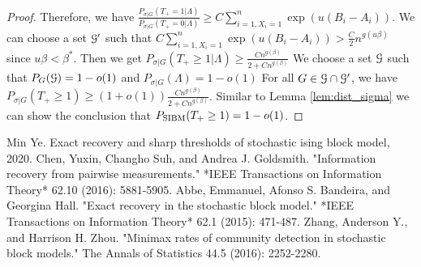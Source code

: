 \documentclass{article}
\begin{document}
\begin{proof}
	Therefore, we have $\frac{P_{\sigma | G}(T_+ = 1 | \Lambda ) }{P_{\sigma | G}(T_+ = 0 | \Lambda )} \geq C\sum_{i=1, X_i=1}^n \exp(u(B_i - A_i))$.
	We can choose a set $\mathcal{G}'$ such that $C\sum_{i=1, X_i=1}^n \exp(u(B_i - A_i)) > \frac{C}{2}n^{g(u\beta)}$ since $u\beta < \beta^*$.
	Then we get $P_{\sigma | G}(T_+\geq 1 | \Lambda) \geq \frac{Cn^{g(\beta)}}{2 + C n^{g(\beta)}} $
	We choose a set $\mathcal{G}$ such that $P_G(\mathcal{G}) = 1-o(1)$ and
	$ P_{\sigma|G} (\Lambda)
	=1- o(1)
	$
	For all $G \in \mathcal{G} \cap \mathcal{G}'$, we have $P_{\sigma | G}(T_+ \geq 1) \geq (1+o(1)) \frac{Cn^{g(\beta)}}{2 + C n^{g(\beta)}}$.
	Similar to Lemma \ref{lem:dist_sigma} we can show the conclusion that $P_{\operatorname{SIBM}}(T_+ \geq 1) = 1-o(1)$.
\end{proof}
\begin{thebibliography}{1}
	

	Min Ye.
	\newblock Exact recovery and sharp thresholds of stochastic ising block model,
	2020.
	Chen, Yuxin, Changho Suh, and Andrea J. Goldsmith. "Information recovery from pairwise measurements." *IEEE Transactions on Information Theory* 62.10 (2016): 5881-5905.
	Abbe, Emmanuel, Afonso S. Bandeira, and Georgina Hall. "Exact recovery in the stochastic block model." *IEEE Transactions on Information Theory* 62.1 (2015): 471-487.
	Zhang, Anderson Y., and Harrison H. Zhou. "Minimax rates of community detection in stochastic block models." The Annals of Statistics 44.5 (2016): 2252-2280.
\end{thebibliography}
\end{document}

